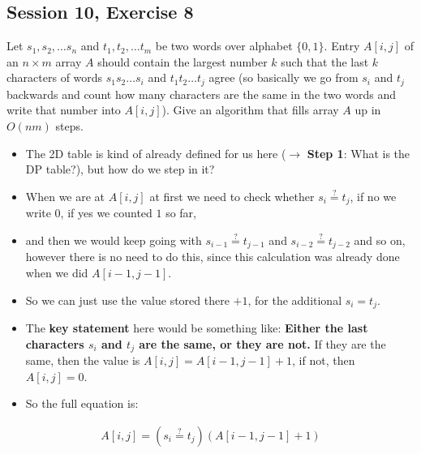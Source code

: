 \subsection {Session 10, Exercise 8}

\label{session_10_exercise_8}


Let $s_1, s_2, \dots{} s_n$ and $t_1, t_2, \dots{} t_m$ be two words over alphabet $\{0, 1\}$. Entry $A[i,j]$ of an $n \times{} m$ array $A$ should contain the largest number $k$ such that the last $k$ characters of words $s_1s_2 \dots{} s_i$ and $t_1t_2 \dots{} t_j$ agree (so basically we go from $s_i$ and $t_j$ backwards and count how many characters are the same in the two words and write that number into $A[i,j]$). Give an algorithm that fills array $A$ up in $O(nm)$ steps.


\begin{itemize}
    \item The 2D table is kind of already defined for us here ($\rightarrow$ \textbf{Step 1}: What is the DP table?), but how do we step in it?
    \item When we are at $A[i,j]$ at first we need to check whether $s_i \stackrel{?}{=} t_j$, if no we write $0$, if yes we counted $1$ so far,
    \item and then we would keep going with $s_{i-1} \stackrel{?}{=} t_{j-1}$ and $s_{i-2} \stackrel{?}{=} t_{j-2}$ and so on, however there is no need to do this, since this calculation was already done when we did $A[i-1, j-1]$.
    \item So we can just use the value stored there $+1$, for the additional $s_i = t_j$.
    \item The \textbf{key statement} here would be something like: \textbf{Either the last characters $s_i$ and $t_j$ are the same, or they are not.} If they are the same, then the value is $A[i,j] = A[i-1,j-1] + 1$, if not, then $A[i,j] = 0$.
    \item So the full equation is:
\end{itemize}

\begin{align*}
  A[i,j] = (s_i \stackrel{?}{=} t_j)(A[i-1,j-1] + 1)
\end{align*}

